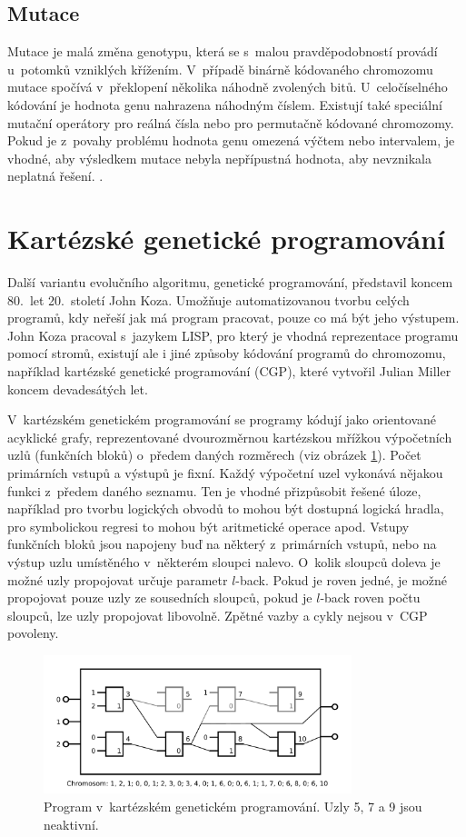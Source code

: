 \subsection{Mutace}

Mutace je malá změna genotypu, která se s~malou pravděpodobností provádí u~potomků vzniklých křížením. V~případě binárně kódovaného chromozomu mutace spočívá v~překlopení několika náhodně zvolených bitů. U~celočíselného kódování je hodnota genu nahrazena náhodným číslem. Existují také speciální mutační operátory pro reálná čísla nebo pro permutačně kódované chromozomy. Pokud je z~povahy problému hodnota genu omezená výčtem nebo intervalem, je vhodné, aby výsledkem mutace nebyla nepřípustná hodnota, aby nevznikala neplatná řešení. \cite{Modra}.

\section{Kartézské genetické programování}
\label{secCGP}

Další variantu evolučního algoritmu, genetické programování, představil koncem 80.~let 20.~století John Koza. Umožňuje automatizovanou tvorbu celých programů, kdy neřeší jak má program pracovat, pouze co má být jeho výstupem. John Koza pracoval s~jazykem LISP, pro který je vhodná reprezentace programu pomocí stromů, existují ale i jiné způsoby kódování programů do chromozomu, například kartézské genetické programování (CGP), které vytvořil Julian Miller koncem devadesátých let.

V~kartézském genetickém programování se programy kódují jako orientované acyklické grafy, reprezentované dvourozměrnou kartézskou mřížkou výpočetních uzlů (funkčních bloků) o~předem daných rozměrech (viz obrázek \ref{obrCGP}). Počet primárních vstupů a výstupů je fixní. Každý výpočetní uzel vykonává nějakou funkci z~předem daného seznamu. Ten je vhodné přizpůsobit řešené úloze, například pro tvorbu logických obvodů to mohou být dostupná logická hradla, pro symbolickou regresi to mohou být aritmetické operace apod. Vstupy funkčních bloků jsou napojeny buď na některý z~primárních vstupů, nebo na výstup uzlu umístěného v~některém sloupci nalevo. O~kolik sloupců doleva je možné uzly propojovat určuje parametr $l$-back. Pokud je roven jedné, je možné propojovat pouze uzly ze sousedních sloupců, pokud je $l$-back roven počtu sloupců, lze uzly propojovat libovolně. Zpětné vazby a cykly nejsou v~CGP povoleny.

\begin{figure}[htb]
    \centering\includegraphics[width=0.8\textwidth]{fig/cgp.pdf}
    \caption{Program v~kartézském genetickém programování. Uzly 5, 7 a 9 jsou neaktivní.}
    \label{obrCGP}
\end{figure}

